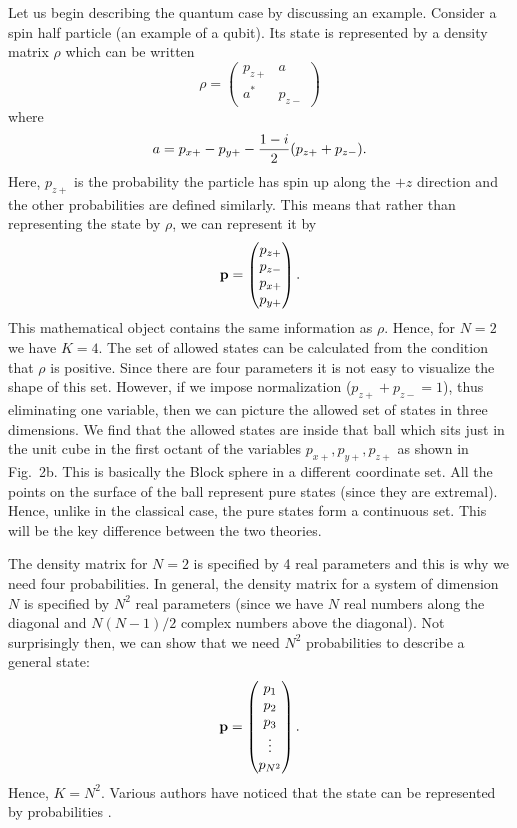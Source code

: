 \documentclass[10pt]{article}
\begin{document}
Let us begin describing the quantum case by discussing an example.
Consider a spin half particle (an example of a qubit).  Its state is
represented by a density matrix $\rho$ which can be written
\begin{equation}
\rho= \left( \begin{matrix} p_{z+} & a \\ a^* & p_{z-} \end{matrix}
\right)
\end{equation}
where
\begin{equation}
a=p_{x+} - p_{y+} - {1-i\over 2}(p_{z+}+p_{z-}).
\end{equation}
Here, $p_{z+}$ is the probability the particle has
spin up along the $+z$ direction and the other probabilities are defined
similarly.  This means that rather than
representing the state by $\rho$, we can represent it by
\begin{equation}
{\bf p} = \left( \begin{matrix} p_{z+} \\ p_{z-} \\ p_{x+} \\ p_{y+}
\end{matrix} \right).
\end{equation}
This mathematical object contains the same information as $\rho$.
Hence, for $N=2$ we have $K=4$.  The set of allowed states can be
calculated from the condition that $\rho$ is positive.  Since there are
four parameters it is not easy to visualize the shape of this set.
However, if we impose normalization ($p_{z+}+p_{z-}=1$), thus eliminating
one variable, then we can picture the allowed set of states in three
dimensions.  We find that the allowed states are inside that ball which sits
just in the unit cube in the first octant of the variables
$p_{x+}, p_{y+}, p_{z+}$ as shown in Fig.~2b.  This is basically the
Block sphere in a different coordinate set.  All the points on the
surface of the ball represent pure states (since they are extremal).
Hence, unlike in the classical case, the pure states form a continuous
set.  This will be the key difference between the two theories.

The density matrix for $N=2$ is specified by 4 real parameters and this
is why we need four probabilities.  In general, the density matrix for a
system of dimension $N$ is specified by $N^2$ real parameters (since we have
$N$ real numbers along the diagonal and $N(N-1)/2$ complex numbers above
the diagonal).  Not surprisingly then, we can show that we
need $N^2$ probabilities to describe a general state:
\begin{equation}
  {\bf p} = \left(
  \begin{matrix} p_1 \\ p_2 \\ p_3 \\ \vdots \\ p_{N^2} \end{matrix}
  \right).
\end{equation}
Hence, $K=N^2$.  Various authors have noticed that the state can be
represented by probabilities \cite{wootters,prug,busch,stefan}.
\end{document}
